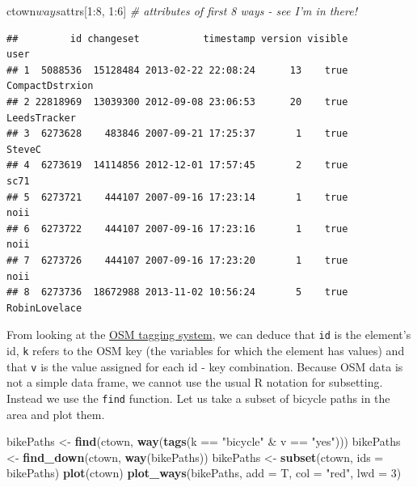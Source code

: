 \documentclass[]{article}
\newenvironment{Shaded}{}{}
\newcommand{\KeywordTok}[1]{\textcolor[rgb]{0.00,0.44,0.13}{\textbf{{#1}}}}
\newcommand{\DataTypeTok}[1]{\textcolor[rgb]{0.56,0.13,0.00}{{#1}}}
\newcommand{\DecValTok}[1]{\textcolor[rgb]{0.25,0.63,0.44}{{#1}}}
\newcommand{\StringTok}[1]{\textcolor[rgb]{0.25,0.44,0.63}{{#1}}}
\newcommand{\CommentTok}[1]{\textcolor[rgb]{0.38,0.63,0.69}{\textit{{#1}}}}
\newcommand{\NormalTok}[1]{{#1}}
\begin{document}
\begin{Shaded}
\begin{Highlighting}[]
\NormalTok{ctown$ways$attrs[}\DecValTok{1}\NormalTok{:}\DecValTok{8}\NormalTok{, }\DecValTok{1}\NormalTok{:}\DecValTok{6}\NormalTok{]  }\CommentTok{# attributes of first 8 ways - see I'm in there!}
\end{Highlighting}
\end{Shaded}

\begin{verbatim}
##         id changeset           timestamp version visible            user
## 1  5088536  15128484 2013-02-22 22:08:24      13    true CompactDstrxion
## 2 22818969  13039300 2012-09-08 23:06:53      20    true    LeedsTracker
## 3  6273628    483846 2007-09-21 17:25:37       1    true          SteveC
## 4  6273619  14114856 2012-12-01 17:57:45       2    true            sc71
## 5  6273721    444107 2007-09-16 17:23:14       1    true            noii
## 6  6273722    444107 2007-09-16 17:23:16       1    true            noii
## 7  6273726    444107 2007-09-16 17:23:20       1    true            noii
## 8  6273736  18672988 2013-11-02 10:56:24       5    true   RobinLovelace
\end{verbatim}

From looking at the \href{http://wiki.openstreetmap.org/wiki/Tags}{OSM
tagging system}, we can deduce that \texttt{id} is the element's id,
\texttt{k} refers to the OSM key (the variables for which the element
has values) and that \texttt{v} is the value assigned for each id - key
combination. Because OSM data is not a simple data frame, we cannot use
the usual R notation for subsetting. Instead we use the \texttt{find}
function. Let us take a subset of bicycle paths in the area and plot
them.

\begin{Shaded}
\begin{Highlighting}[]
\NormalTok{bikePaths <-}\StringTok{ }\KeywordTok{find}\NormalTok{(ctown, }\KeywordTok{way}\NormalTok{(}\KeywordTok{tags}\NormalTok{(k ==}\StringTok{ "bicycle"} \NormalTok{&}\StringTok{ }\NormalTok{v ==}\StringTok{ "yes"}\NormalTok{)))}
\NormalTok{bikePaths <-}\StringTok{ }\KeywordTok{find_down}\NormalTok{(ctown, }\KeywordTok{way}\NormalTok{(bikePaths))}
\NormalTok{bikePaths <-}\StringTok{ }\KeywordTok{subset}\NormalTok{(ctown, }\DataTypeTok{ids =} \NormalTok{bikePaths)}
\KeywordTok{plot}\NormalTok{(ctown)}
\KeywordTok{plot_ways}\NormalTok{(bikePaths, }\DataTypeTok{add =} \NormalTok{T, }\DataTypeTok{col =} \StringTok{"red"}\NormalTok{, }\DataTypeTok{lwd =} \DecValTok{3}\NormalTok{)}
\end{Highlighting}
\end{Shaded}
\end{document}
